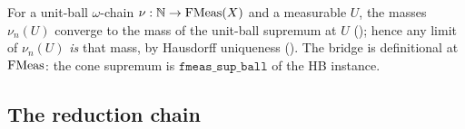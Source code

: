 \begin{lemma}\label{lem:cbv-sup-mass}
\rocqok
{}\rocqok
{}
For a unit-ball $\omega$-chain $\nu : \mathbb{N} \to \mathrm{FMeas}(X)$ and a
measurable $U$, the masses $\nu_n(U)$ converge to the mass of the
unit-ball supremum at $U$
();
hence any limit of $\nu_n(U)$ \emph{is} that mass, by Hausdorff
uniqueness
().
The bridge is definitional at $\mathrm{FMeas}$: the cone supremum is
$\mathtt{fmeas\_sup\_ball}$ of the HB instance.
\end{lemma}

\subsection{The reduction chain}\label{ssec:cbv-reject-chain}

